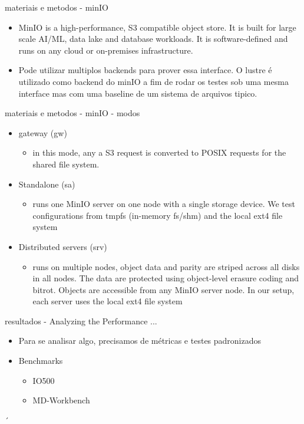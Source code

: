 \documentclass{beamer}
\begin{document}
\begin{frame}{materiais e metodos - minIO}
	\begin{itemize}
		\item 	MinIO is a high-performance, S3 compatible object store. It is built for
		large scale AI/ML, data lake and database workloads. It is software-defined
		and runs on any cloud or on-premises infrastructure.
		\item	Pode utilizar multiplos backends para prover essa interface. O lustre é utilizado como backend do minIO a fim de rodar os testes sob uma mesma interface mas com uma baseline de um sistema de arquivos tipico.
	\end{itemize}
\end{frame}
\begin{frame}{materiais e metodos - minIO - modos}
	\begin{itemize}
		\item gateway (gw)
		\begin{itemize}
			\item in this mode, any a S3 request is converted to POSIX requests for the shared file system.
		\end{itemize}
		\item Standalone (sa)
		\begin{itemize}
			\item runs one MinIO server on one node with a single storage device. We
			test configurations from tmpfs (in-memory fs/shm) and the local ext4 file system
		\end{itemize}
		\item Distributed servers (srv)
		\begin{itemize}
			\item runs on multiple nodes, object data and parity are striped
			across all disks in all nodes. The data are protected using object-level erasure coding
			and bitrot. Objects are accessible from any MinIO server node. In our setup, each
			server uses the local ext4 file system
		\end{itemize}
	\end{itemize}
\end{frame}

\begin{frame}{resultados - Analyzing the Performance ...}
	\begin{itemize}
		\item Para se analisar algo, precisamos de métricas e testes padronizados
		\pause
		\item Benchmarks
		\begin{itemize}
			\item IO500
			\item MD-Workbench
		\end{itemize}
	\end{itemize}
´\end{frame}
\end{document}
